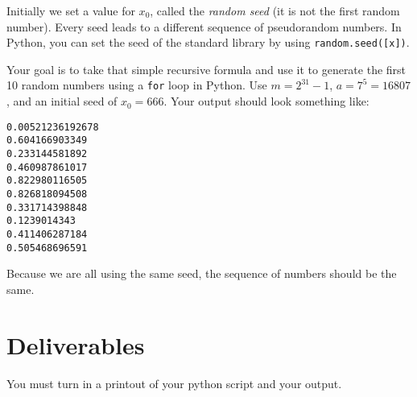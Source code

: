 \begin{fullwidth}
Initially we set a value for $x_0$, called the {\em random seed} (it is not the first random number). Every seed leads to a different sequence of pseudorandom numbers. In Python, you can set the seed of the standard library by using {\tt random.seed([x])}.

Your goal is to take that simple recursive formula and use it to generate the first 10 random numbers using a {\tt for} loop in Python. Use $m = 2^{31} - 1$, $a = 7^5 = 16807$, and an initial seed of $x_0 = 666$.  Your output should look something like:


\begin{verbatim}
0.00521236192678
0.604166903349
0.233144581892
0.460987861017
0.822980116505
0.826818094508
0.331714398848
0.1239014343
0.411406287184
0.505468696591
\end{verbatim}

Because we are all using the same seed, the sequence of numbers should be the same.

\section{Deliverables}

You must turn in a printout of your python script and your output.

\end{fullwidth}
